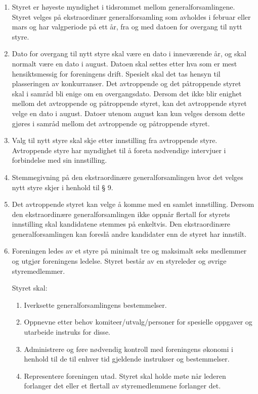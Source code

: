 \documentclass[a4paper,11pt,titlepage]{article}
\begin{document}
\begin{enumerate}

\item Styret er høyeste myndighet i tidsrommet mellom generalforsamlingene. Styret velges på ekstraordinær generalforsamling som avholdes i februar eller mars og har valgperiode på ett år, fra og med datoen for overgang til nytt styre. 

\item Dato for overgang til nytt styre skal være en dato i inneværende år, og skal normalt være en dato i august. Datoen skal settes etter hva som er mest hensiktsmessig for foreningens drift. Spesielt skal det tas hensyn til plasseringen av konkurranser. Det avtroppende og det påtroppende styret skal i samråd bli enige om en overgangsdato. Dersom det ikke blir enighet mellom det avtroppende og påtroppende styret, kan det avtroppende styret velge en dato i august. Datoer utenom august kan kun velges dersom dette gjøres i samråd mellom det avtroppende og påtroppende styret.

\item Valg til nytt styre skal skje etter innstilling fra avtroppende styre. Avtroppende styre har myndighet til å foreta nødvendige intervjuer i forbindelse med sin innstilling.

\item Stemmegivning på den ekstraordinære generalforsamlingen hvor det velges nytt styre skjer i henhold til § 9.

\item Det avtroppende styret kan velge å komme med en samlet innstilling. Dersom den ekstraordinære generalforsamlingen ikke oppnår flertall for styrets innstilling skal kandidatene stemmes på enkeltvis. Den ekstraordinære generalforsamlingen kan foreslå andre kandidater enn de styret har innstilt.

\item Foreningen ledes av et styre på minimalt tre og maksimalt seks medlemmer og utgjør foreningens ledelse. Styret består av en styreleder og øvrige styremedlemmer. 

Styret skal:
\begin{enumerate}
\item Iverksette generalforsamlingens bestemmelser.
\item Oppnevne etter behov komiteer/utvalg/personer for spesielle oppgaver og utarbeide instruks for disse.
\item Administrere og føre nødvendig kontroll med foreningens økonomi i henhold til de til enhver tid gjeldende instrukser og bestemmelser.
\item Representere foreningen utad. Styret skal holde møte når lederen forlanger det eller et flertall av styremedlemmene forlanger det.
\end{enumerate}


\end{enumerate}
\end{document}
